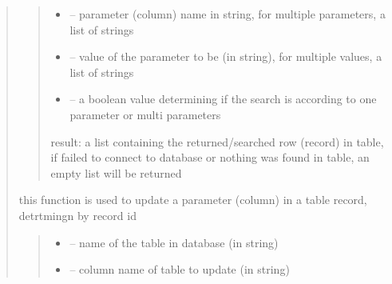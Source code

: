 \documentclass[letterpaper,10pt,english]{sphinxmanual}
\begin{document}
\begin{quote}
\begin{savenotes}
\begin{fulllineitems}
\begin{savenotes}
\begin{fulllineitems}
\begin{quote}
\begin{description}
\begin{itemize}
\item {} 
\sphinxAtStartPar
{} – parameter (column) name in string, for multiple parameters, a list of strings

\item {} 
\sphinxAtStartPar
{} – value of the parameter to be (in string), for multiple values, a list of strings

\item {} 
\sphinxAtStartPar
{} – a boolean value determining if the search is according to one parameter or multi parameters

\end{itemize}

\sphinxAtStartPar
result: a list containing the returned/searched row (record) in table, if failed to connect to database or nothing was found in table, an empty list will be returned

\end{description}\end{quote}

\end{fulllineitems}\end{savenotes}


\begin{savenotes}\begin{fulllineitems}
\label{\detokenize{setting/database:oxin.database.dataBase.update_record}}
\pysigstartsignatures
{}
\pysigstopsignatures
\sphinxAtStartPar
this function is used to update a parameter (column) in a table record, detrtmingn by record id
\begin{quote}\begin{description}
\begin{itemize}
\item {} 
\sphinxAtStartPar
{} – name of the table in database (in string)

\item {} 
\sphinxAtStartPar
{} – column name of table to update (in string)


\end{itemize}
\end{description}
\end{quote}
\end{fulllineitems}
\end{savenotes}
\end{fulllineitems}
\end{savenotes}
\end{quote}
\end{document}

